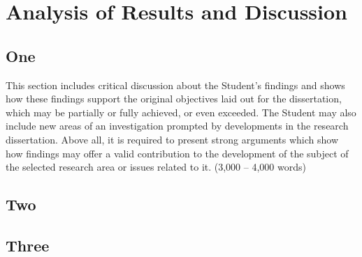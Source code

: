 
\chapter{Analysis of Results and Discussion}
\begin{spacing}{1.5}
\setlength{\parskip}{0.3in}

\section{One}
This section includes critical discussion about the Student’s findings and shows how these findings support the original objectives laid out for the dissertation, which may be partially or
fully achieved, or even exceeded. The Student may also include new areas of an investigation prompted by developments in the research dissertation. Above all, it is required to present strong arguments which show how findings may offer a valid contribution to the development of the subject of the selected research area or issues related to it. (3,000 – 4,000 words)

\section{Two}

\section{Three}


\end{spacing}
\newpage
